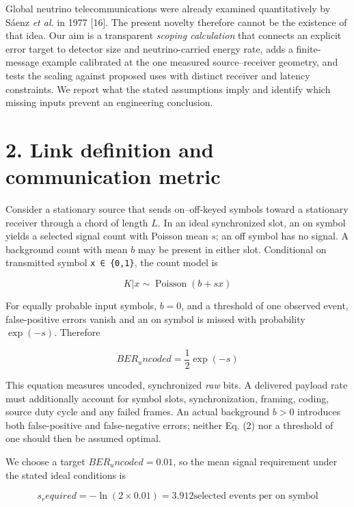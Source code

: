 \documentclass[
]{article}
\begin{document}
Global neutrino telecommunications were already examined quantitatively
by Sáenz \emph{et al.} in 1977 {[}16{]}. The present novelty therefore
cannot be the existence of that idea. Our aim is a transparent
\emph{scoping calculation} that connects an explicit error target to
detector size and neutrino-carried energy rate, adds a finite-message
example calibrated at the one measured source--receiver geometry, and
tests the scaling against proposed uses with distinct receiver and
latency constraints. We report what the stated assumptions imply and
identify which missing inputs prevent an engineering conclusion.

\hypertarget{link-definition-and-communication-metric}{%
\section{2. Link definition and communication
metric}\label{link-definition-and-communication-metric}}

Consider a stationary source that sends on--off-keyed symbols toward a
stationary receiver through a chord of length \(L\). In an ideal
synchronized slot, an on symbol yields a selected signal count with
Poisson mean \(s\); an off symbol has no signal. A background count with
mean \(b\) may be present in either slot. Conditional on transmitted
symbol \texttt{x\ ∈\ \{0,1\}}, the count model is

\[
K | x \sim \operatorname{Poisson}(b + s x) \tag{1}
\]

For equally probable input symbols, \(b = 0\), and a threshold of one
observed event, false-positive errors vanish and an on symbol is missed
with probability \(\exp(-s)\). Therefore

\[
BER_uncoded = \frac{1}{2} \exp(−s) \tag{2}
\]

This equation measures uncoded, synchronized \emph{raw} bits. A
delivered payload rate must additionally account for symbol slots,
synchronization, framing, coding, source duty cycle and any failed
frames. An actual background \(b > 0\) introduces both false-positive
and false-negative errors; neither Eq. (2) nor a threshold of one should
then be assumed optimal.

We choose a target \(BER_uncoded = 0.01\), so the mean signal
requirement under the stated ideal conditions is

\[
s_required = −\ln(2 × 0.01) = 3.912 \text{selected events per on symbol} \tag{3}
\]
\end{document}
